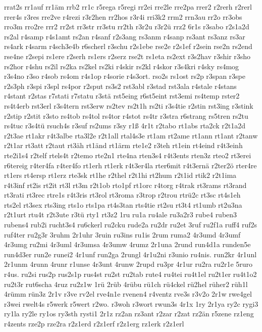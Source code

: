 {rrat2s
rr1auf
rr1äm
rrb2
rr1c
r5rega
r5regi
rr2ei
rre2le
rre2pa
rrer2
r2rerh
r2rerl
rrer4s
r3res
rre2ve
r4rezi
r3r2hen
rr2hos
r3r4i
rri3k2
rrm2
rrn3au
rr2o
rr3obs
rro3m
rro2re
rrr2
rr2st
rr3str
rr3stu
rr2th
r3r2u
r3r2ü
rrz2
6r1s
r3sabo
r2s1a2d
rs2al
r4samp
r4s1amt
rs2an
r4sanf
r2s3ang
rs3anm
r4sanp
rs3ant
rs3anz
rs3ar
rs4ark
r4sarm
r4sch3e4b
r6scherl
r3schu
r2s1ebe
rse2e
r2s1ef
r2sein
rse2n
rs2end
rse4ne
r2sepi
rs1ere
r2serh
rs1ers
r2serz
rse2t
rs1eta
rs2ext
r3s2hav
r3shir
r3sho
rs2hor
r4shu
rs2il
rs2ka
rs2kel
rs2ki
r4skir
rs2kl
r4skor
r3s4kri
r4sky
rs4mog
r3s4no
r3so
r4sob
rs4om
r4s1op
r4sorie
r4s3ort.
rso2s
rs1ost
rs2p
r3span
r3spe
r2s3ph
r3spi
r3spl
rs4por
r2sput
rs3s2
rst3abl
r3stad
rst3ala
r4stale
r4stans
r4stant
r2stas
r7stati
r7statu
r3stä
rst5eing
r6st5eint
rst3emi
rs4temp
rster2
rs4t4erb
rst3erl
r3s4tern
rst3erw
rs2tev
rs2t1h
rs2ti
r3s4tie
r2stin
rst3ing
r3stink
r2stip
r2stit
r3sto
rs4tob
rs4tol
rs4tor
r4stot
rs4tr
r3stra
r6strang
rs5tren
rs2tu
rs4tuc
r3s4tü
rsuch4s
r3suf
rs2ums
r3sy
r1ß
4r1t
r2tabo
rt1abs
rta2ck
r2t1a2d
r2t3ae
rt1akr
r4t3albe
rta3l2e
r2t1all
rtal4s3e
rt1am
rt2ame
rt1ann
rt1ant
r2tanw
r2t1ar
rt3att
r2taut
rt3äh
rt1änd
rt1ärm
rte1e2
r3teh
rt1ein
rt4eind
r4t3einh
rte2i1s4
r2telf
rtels4t
r2temo
rte2n1
rte4na
rten3s4
r4t3ents
rten3z
rteo2
rt3erei
r6tereig
r4ter4fa
r4ter4fo
rt1erh
rt1erk
r4t3er4la
rter6mit
r4t3ernä
r2ter2ö
rter4re
rt1ers
rt4ersp
rt1erz
rte3sk
rt1he
r2thel
r2t1hi
rt2hum
r2t1id
rtik2
r2t1ima
r4t3inf
rt2is
rt2it
rt3l
rt3m
r2t1ob
rto1pf
rt1orc
r4torg
r4trak
rt3rams
rt3rand
rt3rati
rt3rec
rtre1s
r4t3ris
rt3rol
rt3roma
r3trop
r2trou
rtrü2c
rt3sc
rt4s1eh
rts2el
rt3sex
rts3ing
rts1o
rts1pa
rt4s3tan
rts4tie
rt2su
rt3t4
rt1umb
rt2u3na
r2t1urt
rtu4t
r2t3ute
r3tü
rty1
rt3z2
1ru
ru1a
ru4ale
ru3a2r3
rube4
ruben3
rubens4
rub2i
rucht3s4
ru6ckerl
ru2cku
rude2a
ru2dr
ru2et
3ruf
ru2f1a
ruff4
ruf2s
ruf4ter
ru2g3r
3ruhm
2r1uhr
3ruin
ru3ins
ru1is
2rum
ruma2
4r3umd
4r3umf
4r3umg
ru2mi
4r3uml
4r3umsa
4r3umw
4rumz
2r1una
2rund
run4d1a
runden5e
run4d3er
run2e
runei2
4r1unf
run2ga
2rungl
4r1u2ni
r3unio
ru4nis.
run2kr
4r1unl
2r1unm
4runn
4runr
r1unse
4r3unt
4runw
2rupd
ru3pr
4r1ur
ru2ra
ru2r1e
5ruro
r4us.
ru2si
rus2p
rus2s1p
rus4st
ru2st
ru2tab
rute4
ru4tei
ru4t1el
ru2t1er
ru4t1o2
ru2t3r
rut6scha
4ruz
ru2z1w
1rü
2rüb
4rübu
rü1ch
rü4ckel
rü2hel
rüher2
rüh1l
4rümm
rün3z
2r1v
r3ve
rv2el
rve4n1e
rvenen4
r4ventz
rve3s
r3v2o
2r1w
rwe4gel
r3wei
rwelt4s
r5werk
r5wert
r2wo.
r3woh
r3wort
rwun3s
4r1x
1ry
2r1ya
ry2c
rygi3
ry1la
ry2le
ry1os
ry3sth
rysti1
2r1z
rz2an
rz3ant
r2zar
r2zat
rz2än
r5zene
rz1eng
r4zents
rze2p
rze2ra
r2z1erd
r2z1erf
r2z1erg
rz1erk
r2z1erl
}
